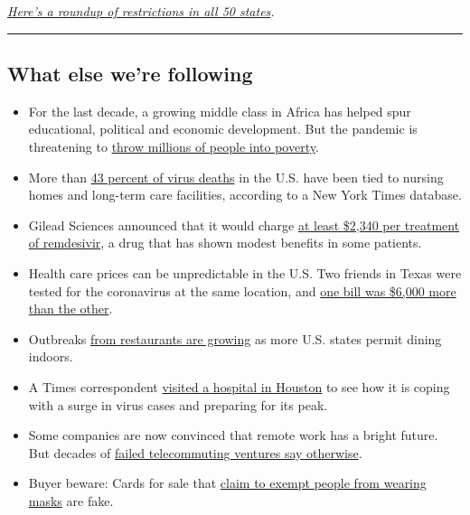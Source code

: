 \href{https://www.nytimes.com/interactive/2020/us/states-reopen-map-coronavirus.html}{\emph{Here's
a roundup of restrictions in all 50 states}}\emph{.}

\begin{center}\rule{0.5\linewidth}{\linethickness}\end{center}

\hypertarget{what-else-were-following}{%
\subsection{What else we're following}\label{what-else-were-following}}

\begin{itemize}
\item
  For the last decade, a growing middle class in Africa has helped spur
  educational, political and economic development. But the pandemic is
  threatening to
  \href{https://www.nytimes.com/2020/06/29/world/africa/Africa-middle-class-coronavirus.html}{throw
  millions of people into poverty}.
\item
  More than
  \href{https://www.nytimes.com/interactive/2020/us/coronavirus-nursing-homes.html}{43
  percent of virus deaths} in the U.S. have been tied to nursing homes
  and long-term care facilities, according to a New York Times database.
\item
  Gilead Sciences announced that it would charge
  \href{https://www.nytimes.com/2020/06/29/world/coronavirus-updates.html\#link-3789537d}{at
  least \$2,340 per treatment of remdesivir}, a drug that has shown
  modest benefits in some patients.
\item
  Health care prices can be unpredictable in the U.S. Two friends in
  Texas were tested for the coronavirus at the same location, and
  \href{https://www.nytimes.com/2020/06/29/upshot/coronavirus-tests-unpredictable-prices.html?action=click\&module=Top\%20Stories\&pgtype=Homepage}{one
  bill was \$6,000 more than the other}.
\item
  Outbreaks
  \href{https://www.nytimes.com/2020/06/28/world/coronavirus-updates.html\#link-212c33ba}{from
  restaurants are growing} as more U.S. states permit dining indoors.
\item
  A Times correspondent
  \href{https://www.nytimes.com/2020/06/28/us/coronavirus-hospital-houston.html}{visited
  a hospital in Houston} to see how it is coping with a surge in virus
  cases and preparing for its peak.
\item
  Some companies are now convinced that remote work has a bright future.
  But decades of
  \href{https://www.nytimes.com/2020/06/29/technology/working-from-home-failure.html}{failed
  telecommuting ventures say otherwise}.
\item
  Buyer beware: Cards for sale that
  \href{https://www.nytimes.com/2020/06/28/world/coronavirus-updates.html\#link-6f2f6d9a}{claim
  to exempt people from wearing masks} are fake.
\end{itemize}


